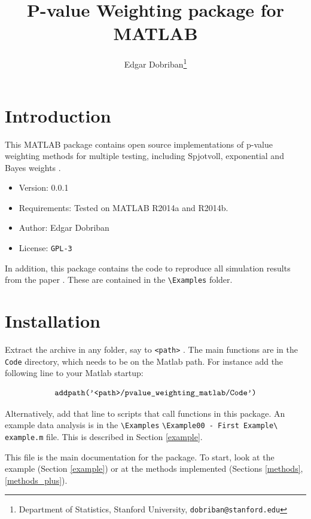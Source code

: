\documentclass[english,11pt]{article} %
\title{P-value Weighting package for MATLAB}
\author{Edgar Dobriban\thanks{Department of Statistics, Stanford University, \texttt{dobriban@stanford.edu}} }
\begin{document}
\maketitle
\tableofcontents
\section{Introduction}

This MATLAB package contains open source implementations of p-value weighting methods for multiple testing, including Spjotvoll, exponential and Bayes weights \citep[proposed in][]{dobriban2015optimal}. %

\begin{itemize}
\item{Version: } 0.0.1
\item{Requirements: } Tested on MATLAB R2014a and R2014b. 
\item{Author: } Edgar Dobriban
\item{License: } \verb+GPL-3+
\end{itemize}

In addition, this package contains the code to reproduce all simulation results from the paper \cite{dobriban2015optimal}. These are contained in the \verb+\Examples+ folder.

\section{Installation}

Extract the archive in any folder, say to \verb+<path>+ . The main functions are in the \verb+Code+ directory, which needs to be on the Matlab path. For instance add the following line to your Matlab startup:

$$\verb+addpath('<path>/pvalue_weighting_matlab/Code')+$$

Alternatively,  add that line to scripts that call functions in this package. An example data analysis is in the \verb+\Examples+ \verb+\Example00 - First Example\+ \verb+example.m+ file. This is described in Section \ref{example}.

This file is the main documentation for the package. To start, look at the example (Section \ref{example}) or at the methods implemented (Sections \ref{methods}, \ref{methods_plus}).

%
%
\end{document}

